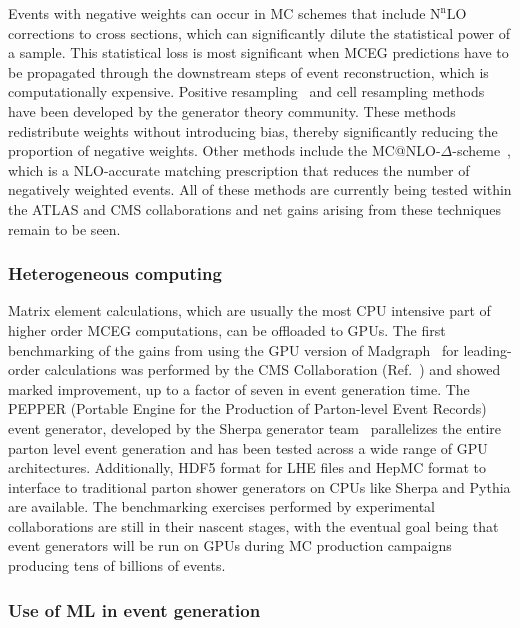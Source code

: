 \documentclass[10pt,a4paper]{article}
\begin{document}
Events with negative weights can occur in MC schemes that include
$\mathrm{N}^\mathrm{n}\mathrm{LO}$ corrections to cross sections, which can significantly dilute
the statistical power of a sample. This statistical loss is most
significant when MCEG predictions have to be propagated through the
downstream steps of event reconstruction, which is computationally
expensive. Positive
resampling~\cite{Andersen:2020sjs} and
cell resampling
methods~\cite{Andersen:2021mvw} have been
developed by the generator theory community. These methods redistribute
weights without introducing bias, thereby significantly reducing the
proportion of negative weights. Other methods include the
MC@NLO-$\Delta$-scheme~\cite{Frederix:2020trv},
which is a NLO-accurate matching prescription that reduces the number of
negatively weighted events. All of these methods are currently being
tested within the ATLAS and CMS collaborations and net gains arising
from these techniques remain to be seen.

\subsubsection{Heterogeneous computing}\label{heterogeneous-computing}

Matrix element calculations, which are usually the most CPU intensive
part of higher order MCEG computations, can be offloaded to GPUs. The
first benchmarking of the gains from using the GPU version of
Madgraph~\cite{Alwall:2014hca,MadgraphOnGPU}
for leading-order calculations was performed by the CMS Collaboration
(Ref.~\cite{CMS-DP-2024-086}) and showed
marked improvement, up to a factor of seven in event generation time.
The PEPPER (Portable Engine for the Production of Parton-level Event
Records)~\cite{Bothmann:2023gew} event
generator, developed by the Sherpa generator
team~\cite{Sherpa:2019gpd} parallelizes
the entire parton level event generation and has been tested across a
wide range of GPU architectures. Additionally, HDF5 format for LHE files
and HepMC format to interface to traditional parton shower generators on
CPUs like Sherpa and Pythia are available. The benchmarking exercises
performed by experimental collaborations are still in their nascent
stages, with the eventual goal being that event generators will be run
on GPUs during MC production campaigns producing tens of billions of
events.

\subsubsection{Use of ML in event generation}
\label{use-of-ml-in-event-generation}
\end{document}
